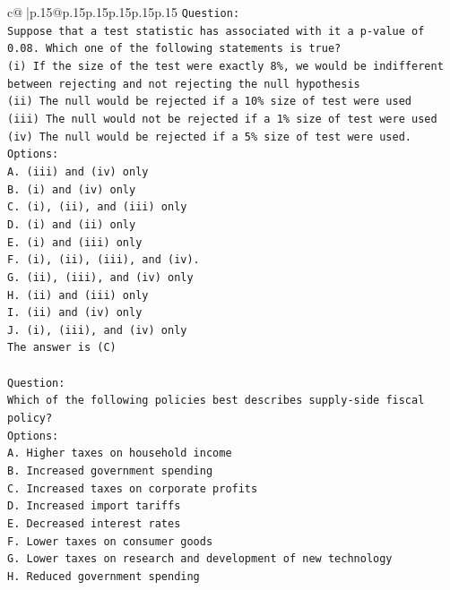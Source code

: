 \documentclass{article}
\begin{document}
{\begin{supertabular}{c@{$\;$}|p{.15\linewidth}@{}p{.15\linewidth}p{.15\linewidth}p{.15\linewidth}p{.15\linewidth}p{.15\linewidth}}
{{{\texttt{Question:} \\
\texttt{Suppose that a test statistic has associated with it a p{-}value of 0.08. Which one of the following statements is true?} \\
\texttt{(i) If the size of the test were exactly 8\%, we would be indifferent between rejecting and not rejecting the null hypothesis} \\
\texttt{(ii) The null would be rejected if a 10\% size of test were used} \\
\texttt{(iii) The null would not be rejected if a 1\% size of test were used} \\
\texttt{(iv) The null would be rejected if a 5\% size of test were used.} \\
\texttt{Options:} \\
\texttt{A. (iii) and (iv) only} \\
\texttt{B. (i) and (iv) only} \\
\texttt{C. (i), (ii), and (iii) only} \\
\texttt{D. (i) and (ii) only} \\
\texttt{E. (i) and (iii) only} \\
\texttt{F. (i), (ii), (iii), and (iv).} \\
\texttt{G. (ii), (iii), and (iv) only} \\
\texttt{H. (ii) and (iii) only} \\
\texttt{I. (ii) and (iv) only} \\
\texttt{J. (i), (iii), and (iv) only} \\
\texttt{The answer is (C)} \\
\\ 
\texttt{Question:} \\
\texttt{Which of the following policies best describes supply{-}side fiscal policy?} \\
\texttt{Options:} \\
\texttt{A. Higher taxes on household income} \\
\texttt{B. Increased government spending} \\
\texttt{C. Increased taxes on corporate profits} \\
\texttt{D. Increased import tariffs} \\
\texttt{E. Decreased interest rates} \\
\texttt{F. Lower taxes on consumer goods} \\
\texttt{G. Lower taxes on research and development of new technology} \\
\texttt{H. Reduced government spending} \\
}}}
\end{supertabular}}
\end{document}
